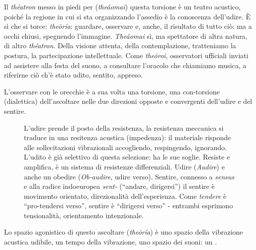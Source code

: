 Il \emph{théatron} messo in piedi per (\emph{theáomai}) questa torsione è un
teatro acustico, poiché la regione in cui si sta organizzando l'assedio è la
conoscenza dell'udire. È sì che si torce: \emph{theōría}: guardare, osservare e,
anche, il risultato di tutto ciò: ma a occhi chiusi, spegnendo l'immagine.
\emph{Theáomai} sì, ma spettatore di altra natura, di altro \emph{théatron}.
Della visione attenta, della contemplazione, tratteniamo la postura, la
partecipazione intellettuale. Come \emph{theōroi}, osservatori ufficiali inviati
ad assistere alla festa del suono, a consultare l'oracolo che chiamiamo musica,
a riferirne ciò ch'è stato udito, sentito, appreso.

L'osservare con le orecchie è a sua volta una torsione, una con-torsione
(dialettica) dell'ascoltare nelle due direzioni opposte e convergenti dell'udire
e del sentire.

\begin{figure}[htbp]
\begin{center}
\caption{L'udire prende il posto della resistenza, la resistenza meccanica si
traduce in una resitenza acustica (impedenza): il materiale risponde alle
sollecitazioni vibrazionali accogliendo, respingendo, ignorando. L'udito è già
selettivo di questa selezione: ha le sue soglie. Resiste e amplifica, è un
sistema di resistenze differenziali. Udire (\emph{Audire}) e anche un obedire
(\emph{Ob-audire}, udire verso). Sentire, connesso a \emph{sensus} e alla radice
indoeuropea \emph{sent-} (“andare, dirigersi”) il sentire è movimento orientato,
direzionalità dell'esperienza. Come \emph{tendere} è “pro-tendersi verso”,
sentire è “dirigersi verso” - entrambi esprimono tensionalità, orientamento
intenzionale.}
\label{ascoltare}
\end{center}
\end{figure}

Lo spazio agonistico \cite{ronchi2001} di questo ascoltare (\emph{theōría}) è
uno spazio della vibrazione acustica udibile, un tempo della vibrazione, uno
spazio dei suoni: un .

